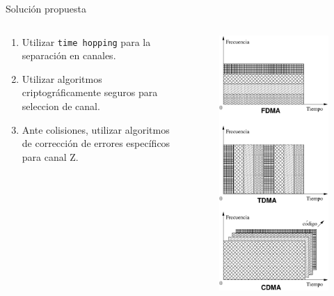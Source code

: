 \documentclass[aspectratio=169]{beamer}
\begin{document}
\begin{frame}{Solución propuesta}
\begin{columns}
  \begin{column}{0.60\textwidth}

\begin{enumerate}
 \item Utilizar \texttt{time hopping} para la separación en canales.
 \item Utilizar algoritmos criptográficamente seguros para seleccion de canal.
 \item Ante colisiones, utilizar algoritmos de corrección de errores específicos para canal Z.
 \end{enumerate}

  \end{column}
  \begin{column}{0.40\textwidth}

 
\begin{figure}[t]
  \centering
  \includegraphics[width=0.55 \textwidth]{../graphs/tdmacdma} 
  \label{fig_tdmacdma}
\end{figure}

  \end{column}
\end{columns}

\end{frame}
\end{document}
